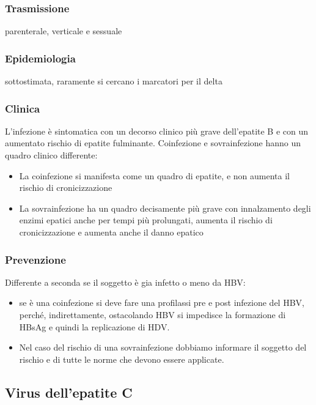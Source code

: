 \subsubsection{Trasmissione}
 parenterale,
  verticale e sessuale

\subsubsection{Epidemiologia} sottostimata,
  raramente si cercano i marcatori per il delta

\subsubsection{Clinica}

  L'infezione è sintomatica con un decorso clinico più grave
  dell'epatite B e con un aumentato rischio di epatite fulminante.
  Coinfezione e sovrainfezione hanno un quadro clinico differente:

\begin{itemize}
\item
  La coinfezione si manifesta come un quadro di epatite, e non aumenta
  il rischio di cronicizzazione
\item
  La sovrainfezione ha un quadro decisamente più grave con innalzamento
  degli enzimi epatici anche per tempi più prolungati, aumenta il
  rischio di cronicizzazione e aumenta anche il danno epatico
  \end{itemize}

\subsubsection{Prevenzione}

  Differente a seconda se il soggetto è gia infetto o meno da HBV:

\begin{itemize}
\item
  se è una coinfezione si deve fare una profilassi pre e post infezione
  del HBV, perché, indirettamente, ostacolando HBV si impedisce la
  formazione di HBsAg e quindi la replicazione di HDV.
\item
  Nel caso del rischio di una sovrainfezione dobbiamo informare il
  soggetto del rischio e di tutte le norme che devono essere applicate.
\end{itemize}

\subsection{Virus dell'epatite C}

